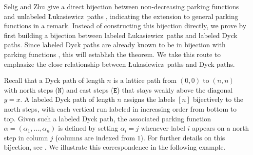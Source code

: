 \documentclass[12pt,reqno]{amsart}
\theoremstyle{definition}
\theoremstyle{remark}
\newcommand{\North}{\texttt{N}}
\newcommand{\East}{\texttt{E}}
\newcommand{\Luka}{\L ukasiewicz}
\begin{document}
Selig and Zhu give a direct bijection between non-decreasing parking functions and unlabeled \Luka~paths \cite[Theorem 2.1]{SZ}, indicating the extension to general parking functions in a remark.
Instead of constructing this bijection directly, we prove  by first building a bijection between labeled \Luka~paths and labeled Dyck paths.
Since labeled Dyck paths are already known to be in bijection with parking functions \cite{Schumacher}, this will establish the theorem.
We take this route to emphasize the close relationship between \Luka~paths and Dyck paths.



Recall that a Dyck path of length $n$ is a lattice path from $(0,0)$ to $(n,n)$ with north steps ($\North$) and east steps ($\East$) that stays weakly above the diagonal $y=x$.
A labeled Dyck path of length $n$ assigns the labels $[n]$ bijectively to the north steps, with each vertical run labeled in increasing order from bottom to top.
Given such a labeled Dyck path, the associated parking function $\alpha=(\alpha_1,\ldots,\alpha_n)$ is defined by setting $\alpha_i=j$ whenever label $i$ appears on a north step in column $j$ (columns are indexed from $1$).
For further details on this bijection, see \cite{Schumacher}.
We illustrate this correspondence in the following example.
\end{document}
